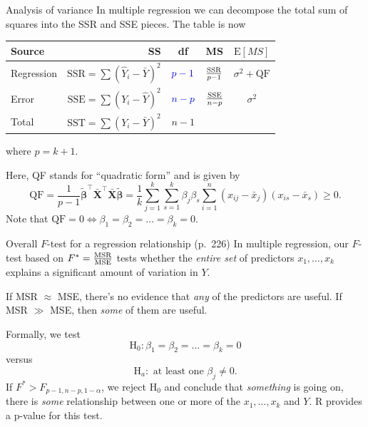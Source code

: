 \documentclass{beamer}
\newcommand{\E}{\mathrm{E}}
\begin{document}
\begin{frame}{Analysis of variance}
In multiple regression we can decompose the total sum of squares into the SSR and SSE pieces. \pause The table is now
\vspace{5pt}

\begin{center}
\begin{footnotesize}
\begin{tabular}{l r c c c}
Source & SS & df & MS & $\E[MS]$\\
\hline
Regression & $\mathrm{SSR}=\sum(\hat{Y}_i-\bar{Y})^2$ & ${\color{blue}p-1}$ & $\frac{\rm SSR}{p-1}$ & $\sigma^2+{\text{QF}}$\\
Error & $\mathrm{SSE}=\sum(Y_i-\hat{Y})^2$ & ${\color{blue}n-p}$ & $\frac{\rm SSE}{n-p}$ & $\sigma^2$\\
\hline
Total & $\mathrm{SST}=\sum(Y_i-\bar{Y})^2$ & $n-1$
\end{tabular}
\end{footnotesize}
\end{center}

where $p=k+1$.
\vspace{10pt}

\pause Here, QF stands for ``quadratic form'' and is given by
$$
\text{QF}=\frac{1}{p-1}\boldsymbol{\tilde\beta}^\top\mathbf{\bar{X}}^\top\mathbf{\bar{X}}\boldsymbol{\tilde\beta}=\frac1k\sum_{j=1}^k\sum_{s=1}^k\beta_j\beta_s\sum_{i=1}^n(x_{ij}-\bar{x}_j)(x_{is}-\bar{x}_s)\ge0.
$$
\pause Note that $\text{QF}=0$\quad $\Leftrightarrow$\quad $\beta_1=\beta_2=\ldots=\beta_k=0$.
\end{frame}

\begin{frame}{Overall $F$-test for a regression relationship (p.~226)}
In multiple regression, our $F$-test based on $F^\ast=\frac{\rm MSR}{\rm MSE}$ tests whether the \textit{entire set} of predictors $x_1,\ldots,x_k$ explains a significant amount of variation in $Y$.
\vspace{10pt}

\pause If MSR $\approx$ MSE, there's no evidence that \textit{any} of the predictors are useful. If MSR $\gg$ MSE, then \textit{some} of them are useful.
\vspace{10pt}

\pause Formally, we test
$$
\mathrm{H}_0: \beta_1=\beta_2=\ldots=\beta_k=0
$$
\pause versus
$$
\mathrm{H}_a: \text{ at least one  }\beta_j\ne0.
$$
\pause If $F^\ast>F_{p-1,n-p,1-\alpha}$, we reject $\mathrm{H}_0$ and conclude that \textit{something} is going on, there is \textit{some} relationship between one or more of the $x_1,\ldots,x_k$ and $Y$. {\sc R} provides a p-value for this test.
\end{frame}
\end{document}
